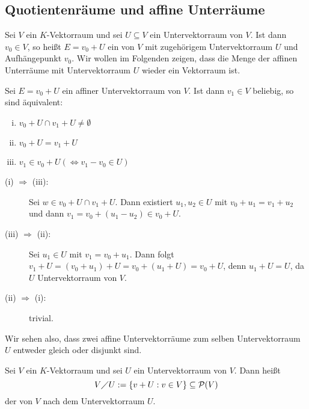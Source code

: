 \subsection{Quotientenräume und affine Unterräume}
\label{sec:2.11}

Sei $V$ ein $K$-Vektorraum und sei $U \subseteq V$ ein Untervektorraum von $V$.
Ist dann $v_0 \in V$, so heißt $E = v_0 + U$ ein  von $V$ mit zugehörigem Untervektorraum $U$ und Aufhängepunkt $v_0$.
Wir wollen im Folgenden zeigen, dass die Menge der affinen Unterräume mit Untervektorraum $U$ wieder ein Vektorraum ist.

\begin{lemma}
	\label{lemma:11.1}
	Sei $E = v_0 + U$ ein affiner Untervektorraum von $V$.
	Ist dann $v_1 \in V$ beliebig, so sind äquivalent:
	\begin{enumerate}[(i)]
		\item $v_0 + U \cap v_1 + U \neq \emptyset$ 
		\item $v_0 + U = v_1 + U$
		\item $v_1 \in v_0 + U (\Leftrightarrow v_1 - v_0 \in U)$
	\end{enumerate}
\end{lemma}

\begin{beweis}
	\begin{description}
		\item[(i) $\Rightarrow$ (iii):] Sei $w \in v_0 + U \cap v_1 + U$.
		Dann existiert $u_1, u_2 \in U$ mit $v_0 + u_1 = v_1 + u_2$ und dann $v_1 = v_0 + (u_1 - u_2) \in v_0 + U$.
		\item[(iii) $\Rightarrow$ (ii):] Sei $u_1 \in U$ mit $v_1 = v_0 + u_1$.
		Dann folgt $v_1 + U = (v_0 + u_1) + U = v_0 + (u_1 + U) = v_0 + U$, denn $u_1 + U = U$, da $U$ Untervektorraum von $V$.
		\item[(ii) $\Rightarrow$ (i):] trivial. 
	\end{description}
\end{beweis}

Wir sehen also, dass zwei affine Untervektorräume zum selben Untervektorraum $U$ entweder gleich oder disjunkt sind.

\begin{definition}[Quotientenraum]
	\label{def:11.2}
	Sei $V$ ein $K$-Vektorraum und sei $U$ ein Untervektorraum von $V$.
	Dann heißt
	\[
		V \diagup U := \{v + U : v \in V\} \subseteq \operatorname{\mathcal{P}}(V)
	\]
	der  von $V$ nach dem Untervektorraum $U$.
\end{definition}

